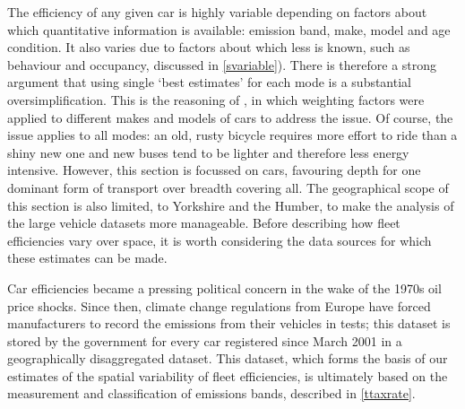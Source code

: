 The efficiency of any given car is highly variable depending on
factors about which quantitative information is available: emission band, make,
model and age condition. It also varies due to factors about which
less is known, such as
behaviour and occupancy, discussed in \cref{svariable}). There is therefore a
strong argument that using single `best estimates' for each mode is a
substantial oversimplification.
This is the reasoning of \citet{Leith2007}, in which weighting
factors were applied to different makes and models of cars to address the issue.
Of course,
the issue applies to all modes: an old, rusty bicycle requires more effort
to ride than a shiny new one and new buses tend to be lighter and therefore
less energy intensive. However, this section is focussed on cars, favouring
depth for one dominant form of transport over breadth covering all.
The geographical scope of this section is also limited, to Yorkshire and the
Humber, to make the analysis of the large vehicle datasets more manageable.
Before describing how fleet efficiencies vary over space, it is worth
considering the data sources for which these estimates can be made.


\label{semdata}
Car efficiencies became a pressing political concern in the wake of the 1970s
oil price shocks. Since then, climate change regulations from Europe have
forced manufacturers to record the emissions from their vehicles in tests;
this dataset is stored by the government for every car registered since March
2001 in a geographically disaggregated dataset. This dataset, which forms the
basis of our estimates of the spatial variability of fleet efficiencies,
is ultimately based on the measurement and classification of emissions bands,
described in \cref{ttaxrate}.

